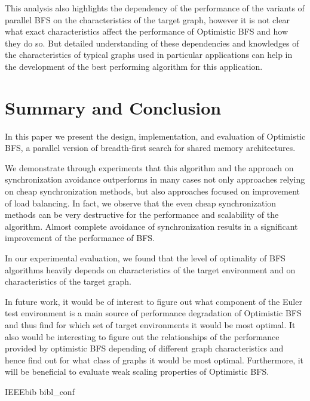 \documentclass[letterpaper]{article}
\begin{document}
		This analysis also highlights the dependency of the performance of the variants of parallel BFS on the characteristics of the target graph, however it is not clear what exact characteristics affect the performance of Optimistic BFS and how they do so. 
		But detailed understanding of these dependencies and knowledges of the characteristics of typical graphs used in particular applications can help in the development of the best performing algorithm for this application.
		
		
		
	\section{Summary and Conclusion}\label{sec:suco} %
		In this paper we present the design, implementation, and evaluation of Optimistic BFS, a parallel version of breadth-first search for shared memory architectures.
		
		We demonstrate through experiments that this algorithm and the approach on synchronization avoidance outperforms in many cases not only approaches relying on cheap synchronization methods, but also approaches focused on improvement of load balancing. 		
		In fact, we observe that the even cheap synchronization methods can be very destructive for the performance and scalability of the algorithm.  
		Almost complete avoidance of synchronization results in a significant improvement of the performance of BFS. %
		
		In our experimental evaluation, we found that the level of optimality of BFS algorithms heavily depends on characteristics of the target environment and on characteristics of the target graph. %
		
		In future work, it would be of interest to figure out what component of the Euler test environment is a main source of performance degradation of Optimistic BFS and thus find for which set of target environments it would be most optimal.  		
		It also would be interesting to figure out the relationships of the performance provided by optimistic BFS depending of different graph characteristics and hence find out for what class of graphs it would be most optimal.
		Furthermore, it will be beneficial to evaluate weak scaling properties of Optimistic BFS.
	
	 	{IEEEbib} %
	 		{bibl_conf}
\end{document}
